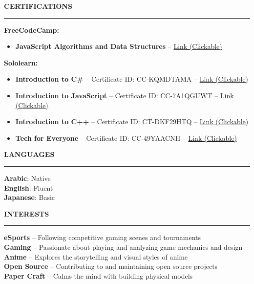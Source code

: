 \documentclass[a4paper,10pt]{article}
\newcommand{\sectionheading}[1]{%
  \addvspace{\medskipamount}%
  {\large\bfseries\MakeUppercase{#1}} %
  \noindent\rule{\linewidth}{0.4pt}%
  \vspace{\smallskipamount}%
}
\begin{document}
\sectionheading{Certifications}

\textbf{FreeCodeCamp:}
\begin{itemize}[nosep]
    \item \textbf{JavaScript Algorithms and Data Structures} -- \href{https://freecodecamp.org/certification/Assayyaad/javascript-algorithms-and-data-structures}{Link (Clickable)}
\end{itemize}

\addvspace{\smallskipamount} %

\textbf{Sololearn:}
\begin{itemize}[nosep]
    \item \textbf{Introduction to C\#} -- Certificate ID: CC-KQMDTAMA -- \href{https://www.sololearn.com/en/certificates/CC-KQMDTAMA}{Link (Clickable)}
    \item \textbf{Introduction to JavaScript} -- Certificate ID: CC-7A1QGUWT -- \href{https://www.sololearn.com/en/certificates/CC-7A1QGUWT}{Link (Clickable)}
    \item \textbf{Introduction to C++} -- Certificate ID: CT-DKF29HTQ -- \href{https://www.sololearn.com/en/certificates/CT-DKF29HTQ}{Link (Clickable)}
    \item \textbf{Tech for Everyone} -- Certificate ID: CC-49YAACNH -- \href{https://www.sololearn.com/en/certificates/CC-49YAACNH}{Link (Clickable)}
\end{itemize}

\sectionheading{Languages}
\textbf{Arabic}: Native \\
\textbf{English}: Fluent \\
\textbf{Japanese}: Basic

\sectionheading{Interests}
\textbf{eSports} -- Following competitive gaming scenes and tournaments \\
\textbf{Gaming} -- Passionate about playing and analyzing game mechanics and design \\
\textbf{Anime} -- Explores the storytelling and visual styles of anime \\
\textbf{Open Source} -- Contributing to and maintaining open source projects \\
\textbf{Paper Craft} -- Calms the mind with building physical models \\
\end{document}
